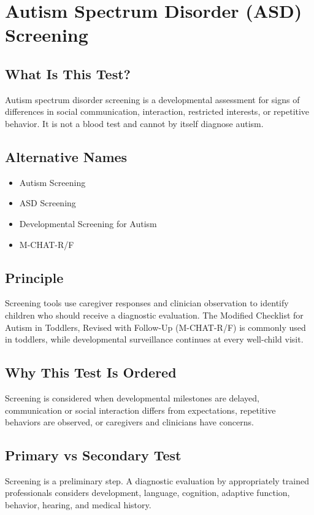 \chapter{Autism Spectrum Disorder (ASD) Screening}

\section*{What Is This Test?}
Autism spectrum disorder screening is a developmental assessment for signs of differences in social communication, interaction, restricted interests, or repetitive behavior. It is not a blood test and cannot by itself diagnose autism.

\section*{Alternative Names}
\begin{itemize}
  \item Autism Screening
  \item ASD Screening
  \item Developmental Screening for Autism
  \item M-CHAT-R/F
\end{itemize}

\section*{Principle}
Screening tools use caregiver responses and clinician observation to identify children who should receive a diagnostic evaluation. The Modified Checklist for Autism in Toddlers, Revised with Follow-Up (M-CHAT-R/F) is commonly used in toddlers, while developmental surveillance continues at every well-child visit.

\section*{Why This Test Is Ordered}
Screening is considered when developmental milestones are delayed, communication or social interaction differs from expectations, repetitive behaviors are observed, or caregivers and clinicians have concerns.

\section*{Primary vs Secondary Test}
Screening is a preliminary step. A diagnostic evaluation by appropriately trained professionals considers development, language, cognition, adaptive function, behavior, hearing, and medical history.

